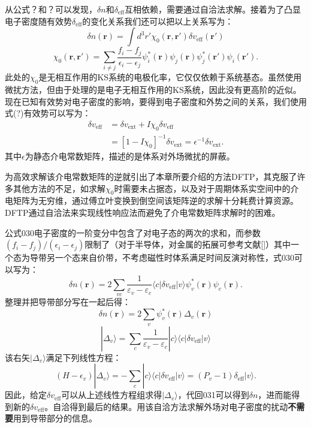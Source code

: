 \documentclass[phd,nobackinfo]{scutthesis}
\begin{document}
从公式？和？可以发现，$\delta n$和$\delta_\mathrm{eff}$互相依赖，需要通过自洽法求解。接着为了凸显电子密度随有效势$\delta_\mathrm{eff}$的变化关系我们还可以把以上关系写为：
\begin{equation}
  \delta n(\bm{r}) = \int d^3 r' \chi_0 (\bm{r},\bm{r'})\delta v_\mathrm{eff}(\bm{r'})
\end{equation}
\begin{equation}
  \chi_0(\bm{r},\bm{r'}) = \sum_{i\neq j}\frac{f_i-f_j}{\epsilon_i-\epsilon_j} \psi^*_i(\bm{r})\psi_j(\bm{r})\psi^*_j(\bm{r'})\psi_i(\bm{r'}).
\end{equation}
此处的$\chi_0$是无相互作用的KS系统的电极化率，它仅仅依赖于系统基态。虽然使用微扰方法，但由于处理的是电子无相互作用的KS系统，因此没有更高阶的近似。
现在已知有效势对电子密度的影响，要得到电子密度和外势之间的关系，我们使用式(?)有效势可以写为：
\begin{align}
  \delta v_\mathrm{eff} &= \delta v_\mathrm{ext} + I \chi_0 \delta v_\mathrm{eff} \\
  &= [1-I\chi_0]^{-1} \delta v_\mathrm{ext} = \epsilon^{-1} \delta v_\mathrm{ext}.
\end{align}
其中$\epsilon$为静态介电常数矩阵，描述的是体系对外场微扰的屏蔽。

为高效求解该介电常数矩阵的逆就引出了本章所要介绍的方法DFTP，其克服了许多其他方法的不足，如求解$\chi_0$时需要未占据态，以及对于周期体系实空间中的介电矩阵为无穷维，通过傅立叶变换到倒空间该矩阵逆的求解十分耗费计算资源。DFTP通过自洽法来实现线性响应法而避免了介电常数矩阵求解时的困难。

公式030电子密度的一阶变分中包含了对电子态的两次的求和，而参数$(f_i-f_j)/(\epsilon_i-\epsilon_j)$限制了（对于半导体，对金属的拓展可参考文献[]）其中一个态为导带另一个态来自价带，不考虑磁性时体系满足时间反演对称性，式030可以写为：
\begin{equation}
  \delta n(\bm{r}) = 2\sum_{vc}\frac{1}{\varepsilon_v-\varepsilon_c}
  \langle c| \delta v_\mathrm{eff} | v\rangle \psi^*_v(\bm{r})\psi_c(\bm{r}).
\end{equation}
整理并把导带部分写在一起后得：
\begin{equation}
  \delta n(\bm{r}) = 2\sum_v \psi^*_v(\bm{r}) \Delta_v(\bm{r})
\end{equation}
\begin{equation}
  |\Delta_v \rangle = \sum_{c}\frac{1}{\varepsilon_v-\varepsilon_c}
  |c\rangle \langle c| \delta v_\mathrm{eff} | v\rangle
\end{equation}
该右矢$|\Delta_v\rangle$满足下列线性方程：
\begin{equation}
  (H-\epsilon_v)|\Delta_v\rangle = -\sum_c |c\rangle \langle c| \delta v_\mathrm{eff} | v\rangle = (P_v-1)\delta_\mathrm{eff}|v\rangle .
\end{equation}
因此，给定$\delta v_\mathrm{eff}$可以从上述线性方程组求得$|\Delta_v\rangle$，代回031可以得到$\delta n$，进而能得到新的$\delta v_\mathrm{eff}$。自洽得到最后的结果。用该自洽方法求解外场对电子密度的扰动{\textbf{不需要}}用到导带部分的信息。
\end{document}
